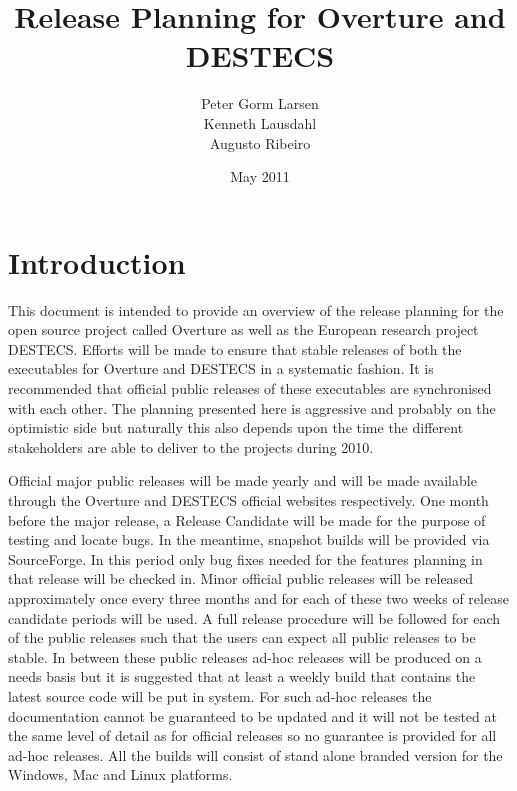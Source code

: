 \documentclass{overturerep}
\begin{document}
 
\title{Release Planning for Overture and DESTECS}
\author{Peter Gorm Larsen\\
        Kenneth Lausdahl\\
        Augusto Ribeiro}

\date{May 2011}

{}     

\maketitle
\tableofcontents
\newpage
% 




\setcounter{page}{1}

\chapter{Introduction}

This document is intended to provide an overview of the release
planning for the open source project called Overture as well as the
European research project DESTECS. Efforts will be made to ensure that
stable releases of both the executables for Overture and DESTECS in a
systematic fashion. It is recommended that official public releases of
these executables are synchronised with each other. The planning
presented here is aggressive and probably on the optimistic side but
naturally this also depends upon the time the different stakeholders
are able to deliver to the projects during 2010.

Official major public releases will be made yearly and will be made
available through the Overture and DESTECS official websites
respectively.  One month before the major release, a Release Candidate
will be made for the purpose of testing and locate bugs. In the
meantime, snapshot builds will be provided via SourceForge. In this
period only bug fixes needed for the features planning in that release
will be checked in. Minor official public releases will be released
approximately once every three months and for each of these two weeks
of release candidate periods will be used. A full release procedure
will be followed for each of the public releases such that the users
can expect all public releases to be stable.  In between these public
releases ad-hoc releases will be produced on a needs basis but it is
suggested that at least a weekly build that contains the latest source
code will be put in system. For such ad-hoc releases the
documentation cannot be guaranteed to be updated and it will not be
tested at the same level of detail as for official releases so no
guarantee is provided for all ad-hoc releases. All the builds will
consist of stand alone branded version for the Windows, Mac and Linux
platforms.
\end{document}
